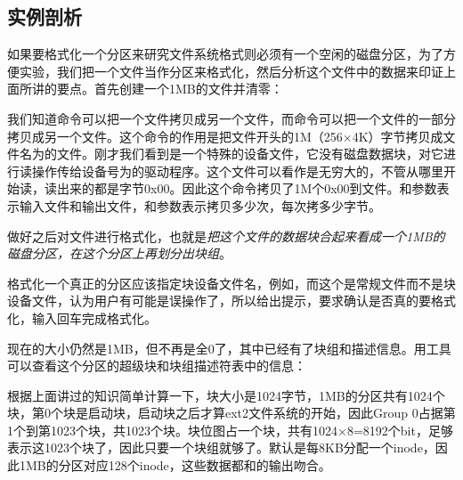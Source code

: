\subsection{实例剖析}
%


如果要格式化一个分区来研究文件系统格式则必须有一个空闲的磁盘分区，为了方便实验，我们把一个文件当作分区来格式化，然后分析这个文件中的数据来印证上面所讲的要点。首先创建一个1MB的文件并清零：




我们知道命令可以把一个文件拷贝成另一个文件，而命令可以把一个文件的一部分拷贝成另一个文件。这个命令的作用是把文件开头的1M（256×\BookSplit{}4K）字节拷贝成文件名为的文件。刚才我们看到是一个特殊的设备文件，它没有磁盘数据块，对它进行读操作传给设备号为的驱动程序。这个文件可以看作是无穷大的，不管从哪里开始读，读出来的都是字节0x00。因此这个命令拷贝了1M个0x00到文件。和参数表示输入文件和输出文件，和参数表示拷贝多少次，每次拷多少字节。



做好之后对文件进行格式化，也就是\emph{把这个文件的数据块合起来看成一个1MB的磁盘分区，在这个分区上再划分出块组}。




格式化一个真正的分区应该指定块设备文件名，例如，而这个是常规文件而不是块设备文件，认为用户有可能是误操作了，所以给出提示，要求确认是否真的要格式化，输入回车完成格式化。



现在的大小仍然是1MB，但不再是全0了，其中已经有了块组和描述信息。用工具可以查看这个分区的超级块和块组描述符表中的信息：




根据上面讲过的知识简单计算一下，块大小是1024字节，1MB的分区共有1024个块，第0个块是启动块，启动块之后才算ext2文件系统的开始，因此Group 0占据第1个到第1023个块，共1023个块。块位图占一个块，共有1024×\BookSplit{}8=\BookSplit{}8192个bit，足够表示这1023个块了，因此只要一个块组就够了。默认是每8KB分配一个inode，因此1MB的分区对应128个inode，这些数据都和的输出吻合。



